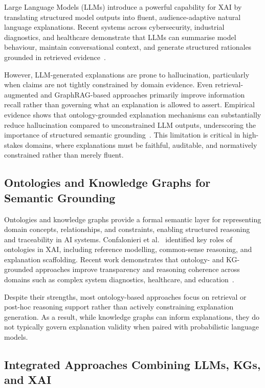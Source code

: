 \documentclass[lnbip]{svmultln}
\begin{document}
Large Language Models (LLMs) introduce a powerful capability for XAI by translating structured model outputs into fluent, audience-adaptive natural language explanations. Recent systems across cybersecurity, industrial diagnostics, and healthcare demonstrate that LLMs can summarise model behaviour, maintain conversational context, and generate structured rationales grounded in retrieved evidence~\cite{ddos2025,klage2026,cip2026,medsum2026,chimera2025,racds2026}.

However, LLM-generated explanations are prone to hallucination, particularly when claims are not tightly constrained by domain evidence. Even retrieval-augmented and GraphRAG-based approaches primarily improve information recall rather than governing what an explanation is allowed to assert. Empirical evidence shows that ontology-grounded explanation mechanisms can substantially reduce hallucination compared to unconstrained LLM outputs, underscoring the importance of structured semantic grounding~\cite{threat2025}. This limitation is critical in high-stakes domains, where explanations must be faithful, auditable, and normatively constrained rather than merely fluent.

\subsection{Ontologies and Knowledge Graphs for Semantic Grounding}

Ontologies and knowledge graphs provide a formal semantic layer for representing domain concepts, relationships, and constraints, enabling structured reasoning and traceability in AI systems. Confalonieri et al.~\cite{confalonieri2021} identified key roles of ontologies in XAI, including reference modelling, common-sense reasoning, and explanation scaffolding. Recent work demonstrates that ontology- and KG-grounded approaches improve transparency and reasoning coherence across domains such as complex system diagnostics, healthcare, and education~\cite{deibo2025,diag2025,gdm2026,synkg2025,learn2024,sop2025}.

Despite their strengths, most ontology-based approaches focus on retrieval or post-hoc reasoning support rather than actively constraining explanation generation. As a result, while knowledge graphs can inform explanations, they do not typically govern explanation validity when paired with probabilistic language models.

\subsection{Integrated Approaches Combining LLMs, KGs, and XAI}
\end{document}
